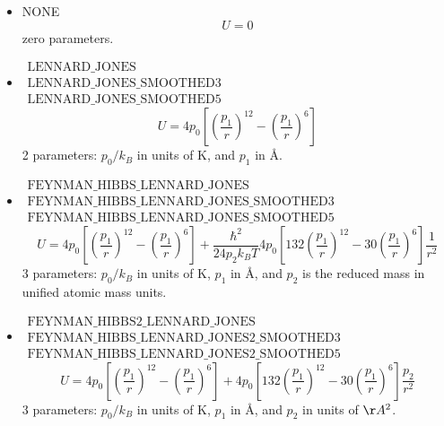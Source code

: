\begin{itemize}

  \item{NONE}\\
  \begin{equation}
    U=0
  \end{equation}
  zero parameters.
\item{$\begin{array}{l}\text{LENNARD\_JONES}\\
      \text{LENNARD\_JONES\_SMOOTHED3}\\
      \text{LENNARD\_JONES\_SMOOTHED5}\end{array}$}\\
  \begin{equation}
    U= 
      4 p_0 \left[\left(\frac{p_1}{r}\right)^{12}-\left(\frac{p_1}{r}\right)^6\right]
  \end{equation}
  2 parameters: $p_0/k_B$ in units of K, and $p_1$ in \AA.
\item{$\begin{array}{l}\text{FEYNMAN\_HIBBS\_LENNARD\_JONES}\\
      \text{FEYNMAN\_HIBBS\_LENNARD\_JONES\_SMOOTHED3}\\
      \text{FEYNMAN\_HIBBS\_LENNARD\_JONES\_SMOOTHED5}\end{array}$}\\
  \begin{equation}
    U=4 p_0 \left[\left(\frac{p_1}{r}\right)^{12}-\left(\frac{p_1}{r}\right)^6\right]
      +\frac{\hbar^2}{24 p_2 k_B T} 4 p_0\left[132\left(\frac{p_1}{r}\right)^{12}-30\left(\frac{p_1}{r}\right)^6\right]\frac{1}{r^2}
  \end{equation}
  3 parameters: $p_0/k_B$ in units of K, $p_1$ in \AA, and $p_2$ is the reduced mass in unified atomic mass units.

\item{$\begin{array}{l}\text{FEYNMAN\_HIBBS2\_LENNARD\_JONES}\\
      \text{FEYNMAN\_HIBBS\_LENNARD\_JONES2\_SMOOTHED3}\\
      \text{FEYNMAN\_HIBBS\_LENNARD\_JONES2\_SMOOTHED5}\end{array}$}\\
  \begin{equation}
    U=4 p_0 \left[\left(\frac{p_1}{r}\right)^{12}-\left(\frac{p_1}{r}\right)^6\right]
      +4 p_0\left[132\left(\frac{p_1}{r}\right)^{12}-30\left(\frac{p_1}{r}\right)^6\right]\frac{p_2}{r^2}
  \end{equation}
  3 parameters: $p_0/k_B$ in units of K, $p_1$ in \AA, and $p_2$ in units of $\AA^2$.


\end{itemize}
